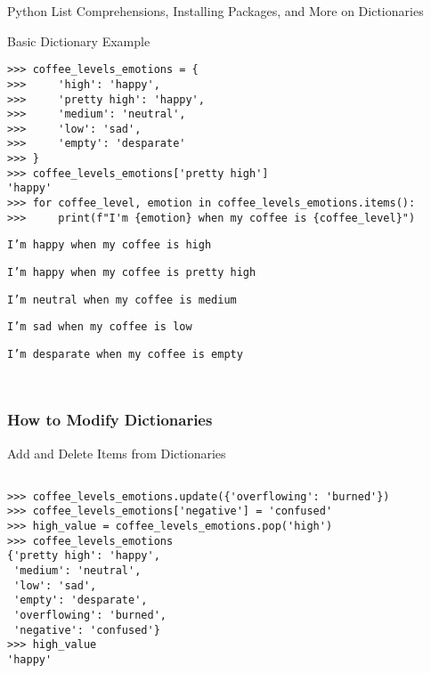 \documentclass[handout, 11pt]{beamer}
\begin{document}
\begin{section}{Python List Comprehensions, Installing Packages, and More on Dictionaries}
\begin{frame}[fragile]
\begin{block}{Basic Dictionary Example}
\begin{verbatim}
>>> coffee_levels_emotions = {
>>>     'high': 'happy',
>>>     'pretty high': 'happy',
>>>     'medium': 'neutral',
>>>     'low': 'sad',
>>>     'empty': 'desparate'
>>> }
>>> coffee_levels_emotions['pretty high']
'happy'
>>> for coffee_level, emotion in coffee_levels_emotions.items():
>>>     print(f"I'm {emotion} when my coffee is {coffee_level}")

\end{verbatim}
\texttt{I'm happy when my coffee is high}

\texttt{I'm happy when my coffee is pretty high}

\texttt{I'm neutral when my coffee is medium}

\texttt{I'm sad when my coffee is low}

\texttt{I'm desparate when my coffee is empty}

\texttt{    }

\end{block}
\end{frame}
\begin{frame}[fragile]
\frametitle{How to Modify Dictionaries}
\begin{block}{Add and Delete Items from Dictionaries}
\begin{verbatim}

>>> coffee_levels_emotions.update({'overflowing': 'burned'})
>>> coffee_levels_emotions['negative'] = 'confused'
>>> high_value = coffee_levels_emotions.pop('high')
>>> coffee_levels_emotions
{'pretty high': 'happy',
 'medium': 'neutral',
 'low': 'sad',
 'empty': 'desparate',
 'overflowing': 'burned',
 'negative': 'confused'}
>>> high_value
'happy'


\end{verbatim}
\end{block}
\end{frame}
\end{section}
\end{document}
